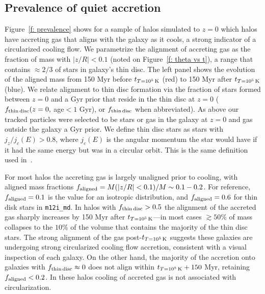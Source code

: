\documentclass[fleqn,usenatbib]{mnras}
\newcommand{\tcon}{t_{T=10^5\,{\rm K}}}
\begin{document}
\subsection{Prevalence of quiet accretion}
\label{s: prevalence}

Figure~\ref{f: prevalence} shows for a sample of halos simulated to $z=0$  which halos have accreting gas that aligns with the galaxy as it cools, a strong indicator of a circularized cooling flow.
We parametrize the alignment of accreting gas as the fraction of mass with $\vert z/R \vert < 0.1$ (noted on Figure~\ref{f: theta vs t}), a range that contains $\approx 2/3$ of stars in galaxy's thin disc.
The left panel shows the evolution of the aligned mass from 150 Myr before $\tcon$ (red) to 150 Myr after $\tcon$ (blue).
We relate alignment to thin disc formation via the fraction of stars formed between $z=0$ and a Gyr prior that reside in the thin disc at $z=0$ ($f_{\rm thin\,disc}(z=0,$ age$<1$ Gyr), or $f_{\rm thin\,disc}$ when abbreviated).
As above our tracked particles were selected to be stars or gas in the galaxy at $z=0$ and gas outside the galaxy a Gyr prior.
We define thin disc stars as stars with $j_z/j_c(E) > 0.8$, where $j_c(E)$ is the angular momentum the star would have if it had the same energy but was in a circular orbit.
This is the same definition used in~\cite{Yu2021}.

For most halos the accreting gas is largely unaligned prior to cooling, with aligned mass fractions $f_{\rm aligned} = M(\vert z/R \vert  <0.1)/M\sim 0.1 - 0.2$.
For reference, $f_{\rm aligned} = 0.1$ is the value for an isotropic distribution, and $f_{\rm aligned} = 0.6$ for thin disk stars in \texttt{m12i\_md}.
In halos with $f_{\rm thin\,disc} > 0.5$ the alignment of the accreted gas sharply increases by 150 Myr after $\tcon$---in most cases $\gtrsim 50\%$ of mass collapses to the $10\%$ of the volume that contains the majority of the thin disc stars.
The strong alignment of the gas post-$\tcon$ suggests these galaxies are undergoing strong circularized cooling flow accretion, consistent with a visual inspection of each galaxy.
On the other hand, the majority of the accretion onto galaxies with $f_{\rm thin\,disc} \approx 0$ does not align within $\tcon+150$ Myr, retaining $f_{\rm aligned}< 0.2$.
In these halos cooling of accreted gas is not associated with circularization.
\end{document}
